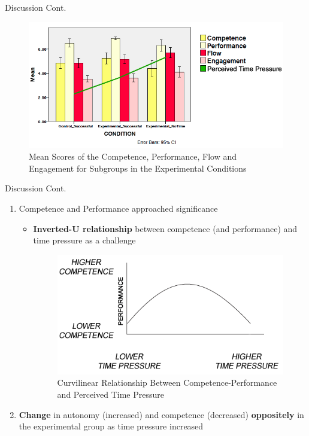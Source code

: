 \documentclass{beamer}
\begin{document}
\begin{frame}{Discussion Cont.}
\begin{figure}[h]
\centering
\includegraphics [width=.9\textwidth,clip]{images/Figure_5_Discussion}
\captionsetup{labelfont=bf, justification=justified,singlelinecheck=false,skip=0pt,belowskip=0pt}
\caption[meanscores]{\fontsize{6.5pt}{6.5}\selectfont Mean Scores of the Competence, Performance, Flow and Engagement for Subgroups in the Experimental Conditions}
\label {fig:discussion}
\end{figure}
\end{frame}

\begin{frame}{Discussion Cont.}
\begin{adjustwidth}{-1.5em}{-1.5em}
\begin{enumerate}\addtocounter{enumi}{1}
\item \alert{Competence} and \alert{Performance} approached significance
	\begin{itemize}
		\item \textbf{Inverted-U relationship} between competence (and performance) and time pressure as a challenge \cite{Lomas2013ChallengeOptimization}
		\begin{figure}[h]
\centering
\includegraphics [width=.5\textwidth,clip]{images/Figure_6_Discussion2}
\captionsetup{labelfont=bf, justification=justified,singlelinecheck=false,skip=0pt,belowskip=0pt}
\caption[inverted]{\fontsize{6.5pt}{6.5}\selectfont Curvilinear Relationship Between Competence-Performance and Perceived Time Pressure}
\label {fig:discussion}
\end{figure}
	\end{itemize}
\item \textbf{Change} in \alert{autonomy} (increased) and \alert{competence} (decreased) \textbf{oppositely} in the experimental group as time pressure increased
\end{enumerate}
\end{adjustwidth}
\end{frame}
\end{document}
